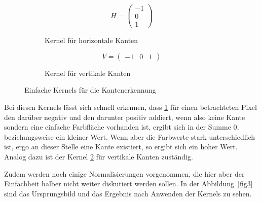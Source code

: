\documentclass[runningheads]{llncs}
\begin{document}
\begin{figure}[H]
    \centering
    \begin{subfigure}{0.45\textwidth}
        \centering
        \[
        H = \begin{pmatrix}
            -1 \\
            0 \\
            1
        \end{pmatrix}
        \]
        \caption{Kernel für horizontale Kanten}
        \label{figKernelsHorizontal}
    \end{subfigure}
    \hfill
    \begin{subfigure}{0.45\textwidth}
        \centering
        \[
        V = \begin{pmatrix}
            -1 & 0 & 1
        \end{pmatrix}
        \]
        \caption{Kernel für vertikale Kanten}
        \label{figKernelsVertical}
    \end{subfigure}
    \caption{Einfache Kernels für die Kantenerkennung}
    \label{figKernels}
\end{figure}

Bei diesen Kernels lässt sich schnell erkennen, dass \ref{figKernelsHorizontal} für einen betrachteten Pixel den darüber negativ und den darunter positiv addiert, wenn also keine Kante sondern eine einfache Farbfläche vorhanden ist, ergibt sich in der Summe 0, beziehungsweise ein kleiner Wert. Wenn aber die Farbwerte stark unterschiedlich ist, ergo an dieser Stelle eine Kante existiert, so ergibt sich ein hoher Wert. Analog dazu ist der Kernel \ref{figKernelsVertical} für vertikale Kanten zuständig.

Zudem werden noch einige Normalisierungen vorgenommen, die hier aber der Einfachheit halber nicht weiter diskutiert werden sollen. In der Abbildung~\ref{fig3} sind das Ursprungsbild und das Ergebnis nach Anwenden der Kernels zu sehen.
\end{document}
